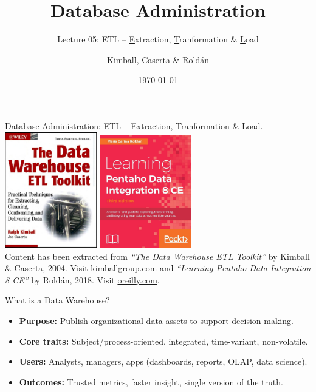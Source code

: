 \documentclass[aspectratio=169]{beamer}
\title[ETL]{Database Administration}
\subtitle{Lecture 05: ETL -- \underline{E}xtraction, \underline{T}ranformation \& \underline{L}oad}
\author{Kimball, Caserta \& Roldán}
\date{\today}
\begin{document}
\frame{\titlepage}

\begin{frame}{Database Administration: ETL -- \underline{E}xtraction, \underline{T}ranformation \& \underline{L}oad.}
    \centering
    \includegraphics[width=0.3\textwidth]{figures/book_cover5}
    \hspace{5mm}
    \includegraphics[width=0.3\textwidth]{figures/book_cover6} \\
    \vspace{1mm}
    {
        \scriptsize
        Content has been extracted from \textit{``The Data Warehouse ETL Toolkit''} by Kimball \& Caserta, 2004. Visit \href{https://www.kimballgroup.com/data-warehouse-business-intelligence-resources/books/data-warehouse-dw-etl-toolkit/}{kimballgroup.com}
        and
        \textit{``Learning Pentaho Data Integration 8 CE''} by Roldán, 2018. Visit \href{https://www.oreilly.com/library/view/learning-pentaho-data/9781788292436/a364bedc-72f6-4ccb-94a7-74c499bda3c4.xhtml}{oreilly.com}.
    }
\end{frame}


\begin{frame}{What is a Data Warehouse?}
\begin{itemize}
  \item \textbf{Purpose:} Publish organizational data assets to support decision-making.
  \item \textbf{Core traits:} Subject/process-oriented, integrated, time-variant, non-volatile.
  \item \textbf{Users:} Analysts, managers, apps (dashboards, reports, OLAP, data science).
  \item \textbf{Outcomes:} Trusted metrics, faster insight, single version of the truth.
\end{itemize}
\end{frame}
\end{document}
